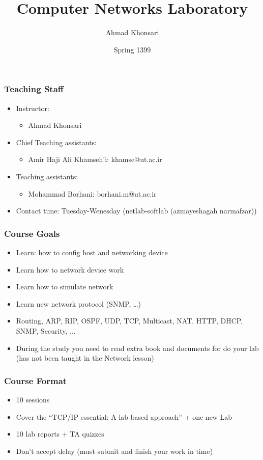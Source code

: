 \documentclass[15pt]{beamer}
\title{Computer Networks Laboratory}
\author{Ahmad Khonsari}
\institute{\url{http://ece.ut.ac.ir/portal/}}
\date{Spring 1399}
\begin{document}
\frame{\titlepage}

\begin{frame}
\frametitle{Teaching Staff}
\begin{itemize}
    \item Instructor:
    \begin{itemize}
        \item Ahmad Khonsari
    \end{itemize}
    \item Chief Teaching assistants:
    \begin{itemize}
        \item Amir Haji Ali Khamseh’i: khamse@ut.ac.ir
    \end{itemize}
    \item Teaching assistants:
    \begin{itemize}
        \item Mohammad Borhani: borhani.m@ut.ac.ir
    \end{itemize}
    \item Contact time: Tuesday-Wenesday (netlab-softlab (azmayeshagah narmafzar))
\end{itemize}

\end{frame}

\begin{frame}
    \frametitle{Course Goals}

    \begin{itemize}
        \item Learn: how to config host and networking device
        \item Learn how to network device work
        \item Learn how to simulate network
        \item Learn new network protocol (SNMP, \dots)
        \item Routing, ARP, RIP, OSPF, UDP, TCP, Multicast, NAT, HTTP, DHCP, SNMP, Security, ...         
        \item During the study you need to read extra book and documents for do your lab (has not been taught in the Network lesson)
    \end{itemize}

\end{frame}

\begin{frame}
    \frametitle{Course Format}

    \begin{itemize}
        \item 10 sessions
        \item Cover the “TCP/IP essential: A lab based approach” + one new Lab
        \item 10 lab reports + TA quizzes
        \item {\color{red} Don’t accept delay (must submit and finish your work in time)}
    \end{itemize}

\end{frame}
\end{document}
